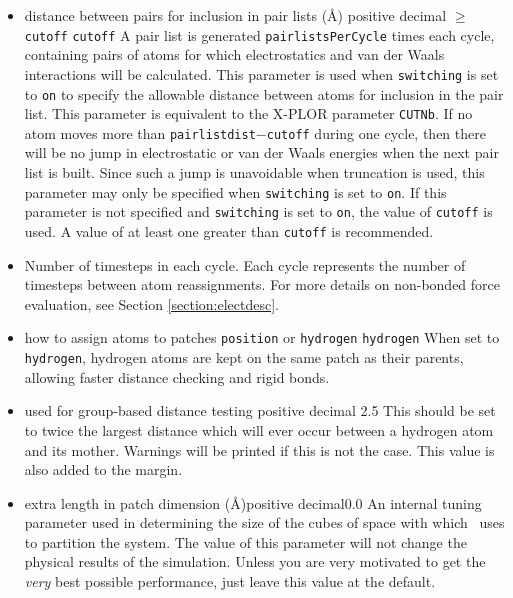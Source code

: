 \begin{itemize}

\item
{}
{distance between pairs for inclusion in pair lists (\AA)}
{positive decimal $\geq$ {\tt cutoff}}
{{\tt cutoff}}
{
A pair list is generated {\tt pairlistsPerCycle} times each cycle, 
containing pairs of atoms for which 
electrostatics and van der Waals interactions will be calculated.
This parameter is used when {\tt switching} is set to {\tt on} to
specify the allowable distance between atoms for inclusion in the
pair list.  
This parameter is equivalent to the X-PLOR parameter {\tt CUTNb}.
If no atom moves more than {\tt pairlistdist}$-${\tt cutoff} during
one cycle, then there will be no jump in electrostatic or van der
Waals energies when the next pair list is built.  Since such a jump
is unavoidable when truncation is used, this parameter may only
be specified when {\tt switching} is set to {\tt on}.  If this
parameter is not specified and {\tt switching} is set to {\tt on},
the value of {\tt cutoff} is used.  
A value of at least one greater than {\tt cutoff} is recommended.  
}

\item
{}
{Number of timesteps in each cycle.  Each cycle represents the number 
of timesteps between atom reassignments.
For more details on non-bonded force evaluation, see
Section \ref{section:electdesc}.}

\item
{}
{how to assign atoms to patches}
{{\tt position} or {\tt hydrogen}}
{{\tt hydrogen}}
{
When set to {\tt hydrogen}, hydrogen atoms are kept on the same patch as their parents, allowing faster distance checking and rigid bonds.
}

\item
{}
{used for group-based distance testing}
{positive decimal}
{2.5}
{
This should be set to twice the largest distance which will ever occur between a hydrogen atom and its mother.  Warnings will be printed if this is not the case.  This value is also added to the margin.
}

\item
{}
{extra length in patch dimension (\AA)}{positive decimal}{0.0}
{An internal tuning parameter used in determining the size of the cubes 
of space with which \NAMD\ uses to partition the system.  The value of 
this parameter will not change the physical results of the simulation.  
Unless you are very motivated to get the {\it very} best 
possible performance, just leave this value at the default.}


\end{itemize}
